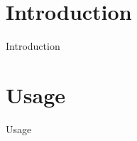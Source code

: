 \documentclass[12pt]{article}
\begin{document}
\balrogtitlepage

\newpage
\tableofcontents

\newpage
\section{Introduction}
\label{sec:intro}
Introduction

\section{Usage}
Usage
\end{document}
